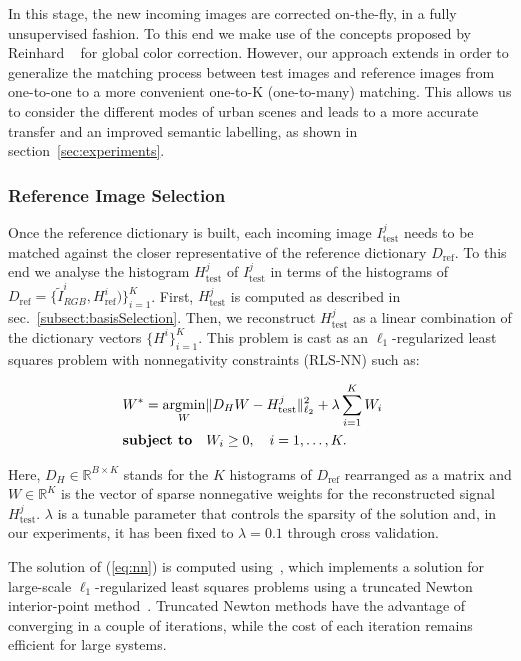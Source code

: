 In this stage, the new incoming images are corrected on-the-fly,
in a fully unsupervised fashion. To this end we make use of the
concepts proposed by Reinhard \etal~\cite{Reinhard:2001} for
global color correction. However, our approach extends
\cite{Reinhard:2001} in order to generalize the matching process
between test images and reference images from one-to-one to a more convenient one-to-K (one-to-many) matching. This
allows us to consider the different modes of urban scenes and
leads to a more accurate transfer and an improved semantic
labelling, as shown in section~\ref{sec:experiments}.

\subsubsection{Reference Image Selection}
\label{subsubsect:selection} Once the reference dictionary is
built, each incoming image $I^j_\text{test}$ needs to be matched
against the closer representative of the reference dictionary
$D_\text{ref}$. To this end we analyse the histogram
$H^j_\text{test}$ of $I^j_\text{test}$ in terms of the histograms of
$D_\text{ref} = \{\tilde{I}^i_{RGB}, H^i_\text{ref}) \}_{i=1}^K$. First,
$H^j_\text{test}$ is computed as described in
sec.~\ref{subsect:basisSelection}. Then, we reconstruct
$H^j_\text{test}$ as a linear combination of the dictionary vectors
$\{H^i\}_{i=1}^K$. This problem is cast as an $\ell_1$-regularized
least squares problem with nonnegativity constraints (RLS-NN) such
as:

\begin{ceqn}
\begin{eqnarray}
\label{eq:nn}
& W^* = \operatorname*{\arg\!\min}_W \lVert D_H W - H^j_\text{test}\rVert^2_{\ell_2} + \lambda  \sum_{i=1}^K {W_i} &\\
& \textbf{subject to} \quad W_i \geq 0, \quad i=1, \dots, K. &\nonumber
\end{eqnarray}
\end{ceqn}

Here, $D_H \in \mathbb{R}^{B \times K}$ stands for the $K$ histograms of
$D_\text{ref}$ rearranged as a matrix and $W \in \mathbb{R}^{K}$ is the vector of sparse
nonnegative weights for the reconstructed signal $H^j_\text{test}$.
$\lambda$ is a tunable parameter that controls the sparsity of the
solution and, in our experiments, it has been fixed to $\lambda =
0.1$ through cross validation.


The solution of (\ref{eq:nn}) is computed
using~\cite{Koh07l1ls:2007}, which implements a solution for
large-scale $\ell_1$-regularized least squares problems using a
truncated Newton interior-point method~\cite{KKL07}. Truncated
Newton methods have the advantage of converging in a couple of
iterations, while the cost of each iteration remains efficient for
large systems.


